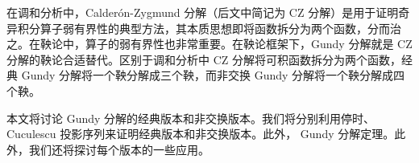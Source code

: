 \begin{abstractzh}

在调和分析中，Calder\'on-Zygmund 分解（后文中简记为 CZ 分解）是用于证明奇异积分算子弱有界性的典型方法，其本质思想即将函数拆分为两个函数，分而治之。在鞅论中，算子的弱有界性也非常重要。在鞅论框架下，Gundy 分解就是 CZ 分解的鞅论合适替代。区别于调和分析中 CZ 分解将可积函数拆分为两个函数，经典 Gundy 分解将一个鞅分解成三个鞅，而非交换 Gundy 分解将一个鞅分解成四个鞅。
\par 本文将讨论 Gundy 分解的经典版本和非交换版本。我们将分别利用停时、Cuculescu 投影序列来证明经典版本和非交换版本。此外， Gundy 分解定理。此外，我们还将探讨每个版本的一些应用。
\end{abstractzh}